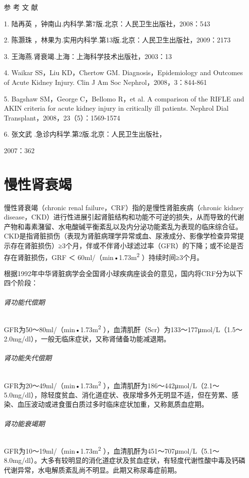 \protect\hypertarget{text00084.html}{}{}

\hypertarget{text00084.htmlux5cux23CHP3-7-7}{}
参 考 文 献

1. 陆再英 ，钟南山.内科学.第7版.北京：人民卫生出版社，2008：543

2. 陈灏珠 ，林果为.实用内科学.第13版.北京：人民卫生出版社，2009：2173

3. 王海燕.肾衰竭.上海：上海科学技术出版社，2003：13

4. Waikar SS，Liu KD，Chertow GM. Diagnosis，Epidemiology and Outcomes
of Acute Kidney Injury. Clin J Am Soc Nephrol，2008，3：844-861

5. Bagshaw SM，George C，Bellomo R，et al. A comparison of the RIFLE and
AKIN criteria for acute kidney injury in critically ill patients.
Nephrol Dial Transplant，2008，23（5）：1569-1574

6. 张文武 .急诊内科学.第2版.北京：人民卫生出版社，

2007：362

\protect\hypertarget{text00085.html}{}{}

\chapter{慢性肾衰竭}

慢性肾衰竭（chronic renal failure，CRF）指的是慢性肾脏疾病（chronic
kidney
disease，CKD）进行性进展引起肾脏结构和功能不可逆的损失，从而导致的代谢产物和毒素潴留、水电酸碱平衡紊乱以及内分泌功能紊乱为表现的临床综合征。CKD是指肾脏损伤（表现为肾脏病理学异常或血、尿液成分、影像学检查异常提示存在肾脏损伤）≥3个月，伴或不伴肾小球滤过率（GFR）的下降；或不论是否存在肾脏损伤，GRF
＜ 60ml/（min•1.73m\textsuperscript{2} ）持续时间≥3个月。

根据1992年中华肾脏病学会全国肾小球疾病座谈会的意见，国内将CRF分为以下四个阶段：

\subparagraph{肾功能代偿期}

GFR为50～80ml/（min•1.73m\textsuperscript{2}
），血清肌酐（Scr）为133～177μmol/L（1.5～2.0mg/dl），一般无临床症状，又称肾储备功能减退期。

\subparagraph{肾功能失代偿期}

GFR为20～49ml/（min•1.73m\textsuperscript{2}
），血清肌酐为186～442μmol/L（2.1～5.0mg/dl），除轻度贫血、消化道症状、夜尿增多外无明显不适，但在劳累、感染、血压波动或进食蛋白质过多时临床症状加重，又称氮质血症期。

\subparagraph{肾功能衰竭期}

GFR为10～19ml/（min•1.73m\textsuperscript{2}
），血清肌酐为451～707μmol/L（5.1～8.0mg/dl）。大多有较明显的消化道症状及贫血症状，有轻度代谢性酸中毒及钙磷代谢异常，水电解质紊乱尚不明显。此期又称尿毒症前期。

